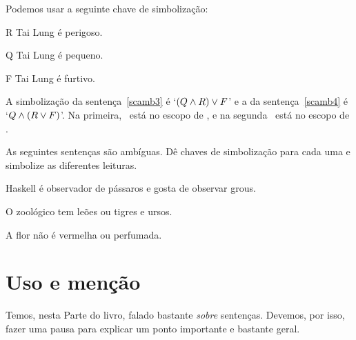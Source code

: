 Podemos usar a seguinte chave de simbolização:
\begin{ekey}
\item[R] Tai Lung é perigoso.
\item[Q] Tai Lung é pequeno.
\item[F] Tai Lung é furtivo.
\end{ekey} 

A simbolização da sentença~\ref{scamb3} é `$(Q \wedge R) \vee F$' e a da sentença~\ref{scamb4} é `$Q \wedge (R \vee F)$'. Na primeira, \eand~está no escopo de \eor, e na segunda \eor~está no escopo de \eand.

\practiceproblems
\solutions
\problempart As seguintes sentenças são ambíguas. Dê chaves de simbolização para cada uma e simbolize as diferentes leituras.
\begin{earg}
	\item Haskell é observador de pássaros e gosta de observar grous.
	\item O zoológico tem leões ou tigres e ursos.
	\item A flor não é vermelha ou perfumada.
\end{earg} 

\chapter{Uso e menção}\label{s:UseMention}
Temos, nesta Parte do livro, falado bastante \emph{sobre} sentenças.
Devemos, por isso, fazer uma pausa para explicar um ponto importante e bastante geral.

